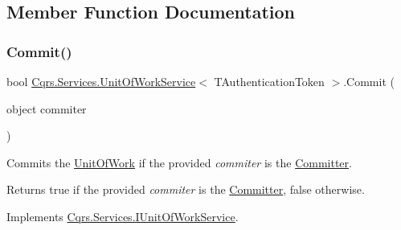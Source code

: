 \subsection{Member Function Documentation}
\mbox{\label{classCqrs_1_1Services_1_1UnitOfWorkService_a3291740821150ecea174820ed27ee56c_a3291740821150ecea174820ed27ee56c}} 
\subsubsection{\texorpdfstring{Commit()}{Commit()}}
{\footnotesize\ttfamily bool \hyperlink{classCqrs_1_1Services_1_1UnitOfWorkService}{Cqrs.\+Services.\+Unit\+Of\+Work\+Service}$<$ T\+Authentication\+Token $>$.Commit (\begin{DoxyParamCaption}\item[{object}]{commiter }\end{DoxyParamCaption})}



Commits the \hyperlink{classCqrs_1_1Services_1_1UnitOfWorkService_a1ba76512e37e5006c2b65d071803e99f_a1ba76512e37e5006c2b65d071803e99f}{Unit\+Of\+Work} if the provided {\itshape commiter}  is the \hyperlink{classCqrs_1_1Services_1_1UnitOfWorkService_aabeccb6ba949fe02b8676b324f85950b_aabeccb6ba949fe02b8676b324f85950b}{Committer}. 

\begin{DoxyReturn}{Returns}
true if the provided {\itshape commiter}  is the \hyperlink{classCqrs_1_1Services_1_1UnitOfWorkService_aabeccb6ba949fe02b8676b324f85950b_aabeccb6ba949fe02b8676b324f85950b}{Committer}, false otherwise. 
\end{DoxyReturn}


Implements \hyperlink{interfaceCqrs_1_1Services_1_1IUnitOfWorkService_a3bd8a6a931fc6f457d136d979d26cead_a3bd8a6a931fc6f457d136d979d26cead}{Cqrs.\+Services.\+I\+Unit\+Of\+Work\+Service}.

\mbox{\label{classCqrs_1_1Services_1_1UnitOfWorkService_a663471bc62f79df22c800ad683a27f59_a663471bc62f79df22c800ad683a27f59}} 
